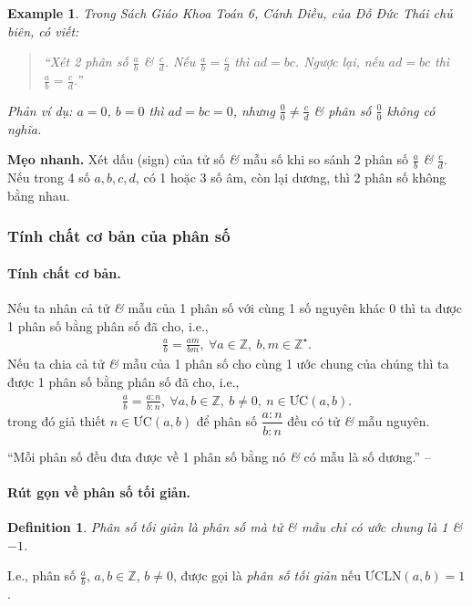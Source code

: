 \documentclass{article}
\numberwithin{equation}{section}
\newtheorem{definition}{Definition}[section]
\newtheorem{example}{Example}[section]
\begin{document}
\begin{example}
	Trong Sách Giáo Khoa Toán 6, Cánh Diều, của Đỗ Đức Thái chủ biên, có viết:
	\begin{quotation}
		``Xét 2 phân số $\frac{a}{b}$ \textit{\&} $\frac{c}{d}$. Nếu $\frac{a}{b} = \frac{c}{d}$ thì $ad = bc$. Ngược lại, nếu $ad = bc$ thì $\frac{a}{b} = \frac{c}{d}$.''
	\end{quotation}
	Phản ví dụ: $a = 0$, $b = 0$ thì $ad = bc = 0$, nhưng $\frac{0}{0}\ne\frac{c}{d}$ \textit{\&} phân số $\frac{0}{0}$ không có nghĩa.
\end{example}
\textbf{Mẹo nhanh.} Xét dấu (sign) của tử số \textit{\&} mẫu số khi so sánh 2 phân số $\frac{a}{b}$ \textit{\&} $\frac{c}{d}$. Nếu trong 4 số $a,b,c,d$, có 1 hoặc 3 số âm, còn lại dương, thì 2 phân số không bằng nhau.

\subsubsection{Tính chất cơ bản của phân số}

\paragraph{Tính chất cơ bản.} Nếu ta nhân cả tử \textit{\&} mẫu của 1 phân số với cùng 1 số nguyên khác 0 thì ta được 1 phân số bằng phân số đã cho, i.e.,
\begin{align*}
	\frac{a}{b} = \frac{am}{bm},\ \forall a\in\mathbb{Z},\ b,m\in\mathbb{Z}^\star.
\end{align*}
Nếu ta chia cả tử \textit{\&} mẫu của 1 phân số cho cùng 1 ước chung của chúng thì ta được 1 phân số bằng phân số đã cho, i.e.,
\begin{align*}
	\frac{a}{b} = \frac{a:n}{b:n},\ \forall a,b\in\mathbb{Z},\ b\ne 0,\ n\in\mbox{ƯC}(a,b).
\end{align*}
trong đó giả thiết $n\in\mbox{ƯC}(a,b)$ để phân số $\dfrac{a:n}{b:n}$ đều có tử \textit{\&} mẫu nguyên.

``Mỗi phân số đều đưa được về 1 phân số bằng nó \textit{\&} có mẫu là số dương.'' -- \cite[p. 28]{Thai_Anh_Dat_Ha_Loan_Nam_Quang_Toan_6_tap_2}

\paragraph{Rút gọn về phân số tối giản.}
\begin{definition}
	\emph{Phân số tối giản} là phân số mà tử \textit{\&} mẫu chỉ có ước chung là 1 \textit{\&} $-1$.
\end{definition}
I.e., phân số $\frac{a}{b}$, $a,b\in\mathbb{Z}$, $b\ne 0$, được gọi là \emph{phân số tối giản} nếu $\mbox{ƯCLN}(a,b) = 1$.
\end{document}
